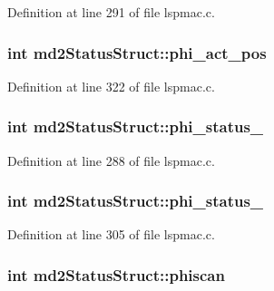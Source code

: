 Definition at line 291 of file lspmac.\-c.

\hypertarget{structmd2StatusStruct_a4de22995a72ff6e72a1a9ccab6d00620}{
\subsubsection[{phi\-\_\-act\-\_\-pos}]{\setlength{\rightskip}{0pt plus 5cm}int md2\-Status\-Struct\-::phi\-\_\-act\-\_\-pos}}\label{structmd2StatusStruct_a4de22995a72ff6e72a1a9ccab6d00620}


Definition at line 322 of file lspmac.\-c.

\hypertarget{structmd2StatusStruct_ad8b8fd90ffff43016e2adaab5ccbfa02}{
\subsubsection[{phi\-\_\-status\-\_\-1}]{\setlength{\rightskip}{0pt plus 5cm}int md2\-Status\-Struct\-::phi\-\_\-status\-\_}}\label{structmd2StatusStruct_ad8b8fd90ffff43016e2adaab5ccbfa02}


Definition at line 288 of file lspmac.\-c.

\hypertarget{structmd2StatusStruct_a0e6cea4c32cb34e602b9ac3d21259219}{
\subsubsection[{phi\-\_\-status\-\_\-2}]{\setlength{\rightskip}{0pt plus 5cm}int md2\-Status\-Struct\-::phi\-\_\-status\-\_}}\label{structmd2StatusStruct_a0e6cea4c32cb34e602b9ac3d21259219}


Definition at line 305 of file lspmac.\-c.

\hypertarget{structmd2StatusStruct_abe3d4a61a15f54590b061e23b45e659c}{
\subsubsection[{phiscan}]{\setlength{\rightskip}{0pt plus 5cm}int md2\-Status\-Struct\-::phiscan}}\label{structmd2StatusStruct_abe3d4a61a15f54590b061e23b45e659c}


